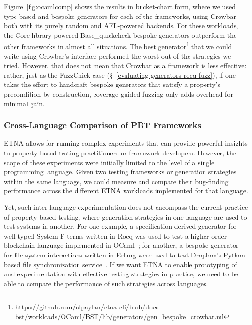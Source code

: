 Figure~\ref{fig:ocamlcomp} shows the results in bucket-chart form, where we used
type-based and bespoke generators for each of the frameworks, using Crowbar both with
its purely random and AFL-powered backends. For these workloads, the Core-library
powered Base\_quickcheck bespoke generators outperform the other frameworks in almost
all situations. The best
generator\footnote{\url{https://github.com/alpaylan/etna-cli/blob/docs-bst/workloads/OCaml/BST/lib/generators/gen_bespoke_crowbar.ml}}
that we could write using Crowbar's interface performed the worst out of the strategies
we tried. However, that does not mean that Crowbar as a framework is less effective:
rather, just as the FuzzChick case (\S~\ref{evaluating-generators-rocq-fuzz}), if one
takes the effort to handcraft bespoke generators that satisfy a property's precondition
by construction, coverage-guided fuzzing only adds overhead for minimal gain.

\subsubsection{Cross-Language Comparison of PBT Frameworks}
\label{evaluating-generators-cross-language}
\label{sec:cross}

ETNA allows for running complex experiments that can provide powerful insights to
property-based testing practitioners or framework developers. However, the scope of
these experiments were initially limited to the level of a single programming language.
Given two testing frameworks or generation strategies within the same language, we
could measure and compare their bug-finding performance across the different ETNA
workloads implemented for that language.

Yet, such inter-language experimentation does not encompass the current practice of
property-based testing, where generation strategies in one language are used to test
systems in another. For one example, a specification-derived generator for well-typed
System F terms written in Rocq was used to test a higher-order blockchain language
implemented in OCaml~\cite{BlockchainTesting}; for another, a bespoke generator for
file-system interactions written in Erlang were used to test Dropbox's Python-based
file synchronization service~\cite{MysteriesOfDropbox2016}. If we want ETNA to enable
prototyping of and experimentation with effective testing strategies in practice, we
need to be able to compare the performance of such strategies across languages.

